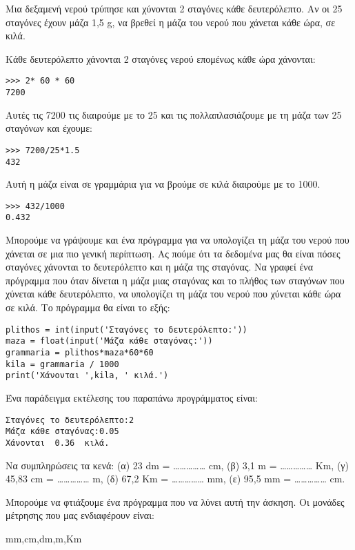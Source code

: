 \begin{exercise}
Μια δεξαμενή νερού τρύπησε και χύνονται 2 σταγόνες κάθε δευτερόλεπτο. Αν οι 25
σταγόνες έχουν μάζα 1,5 g, να βρεθεί η μάζα του νερού που χάνεται κάθε ώρα,
σε κιλά.
\end{exercise}
Κάθε δευτερόλεπτο χάνονται 2 σταγόνες νερού επομένως κάθε ώρα χάνονται:
\begin{lstlisting}
>>> 2* 60 * 60
7200
\end{lstlisting}
Αυτές τις 7200 τις διαιρούμε με το 25 και τις πολλαπλασιάζουμε με τη μάζα των 25 σταγόνων και έχουμε:
\begin{lstlisting}
>>> 7200/25*1.5
432
\end{lstlisting}
Αυτή η μάζα είναι σε γραμμάρια για να βρούμε σε κιλά διαιρούμε με το 1000.
\begin{lstlisting}
>>> 432/1000
0.432
\end{lstlisting}
Μπορούμε να γράψουμε και ένα πρόγραμμα για να υπολογίζει τη μάζα του νερού που χάνεται σε μια πιο γενική περίπτωση. Ας πούμε ότι τα δεδομένα μας θα είναι πόσες σταγόνες χάνονται το δευτερόλεπτο και η μάζα της σταγόνας. Να γραφεί ένα πρόγραμμα που όταν δίνεται η μάζα μιας σταγόνας και το πλήθος των σταγόνων που χύνεται κάθε δευτερόλεπτο, να υπολογίζει τη μάζα του νερού που χύνεται κάθε ώρα σε κιλά.
Το πρόγραμμα θα είναι το εξής:
\begin{lstlisting}
plithos = int(input('Σταγόνες το δευτερόλεπτο:'))
maza = float(input('Μάζα κάθε σταγόνας:'))
grammaria = plithos*maza*60*60
kila = grammaria / 1000
print('Χάνονται ',kila, ' κιλά.')
\end{lstlisting}
Ένα παράδειγμα εκτέλεσης του παραπάνω προγράμματος είναι:
\begin{lstlisting}
Σταγόνες το δευτερόλεπτο:2
Μάζα κάθε σταγόνας:0.05
Χάνονται  0.36  κιλά.
\end{lstlisting}
\begin{exercise}
Να συμπληρώσεις τα κενά: (α) 23 dm = …………… cm, (β) 3,1 m = …………… Km, (γ) 45,83 cm = …………… m, (δ) 67,2 Κm = …………… mm, (ε) 95,5 mm = …………… cm. 
\end{exercise}
Μπορούμε να φτιάξουμε ένα πρόγραμμα που να λύνει αυτή την άσκηση. Οι μονάδες μέτρησης που μας ενδιαφέρουν είναι:

mm,cm,dm,m,Km

